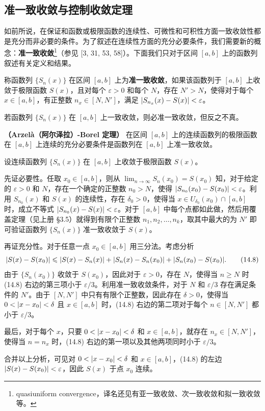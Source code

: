 \subsection{准一致收敛与控制收敛定理}

如前所说，在保证和函数或极限函数的连续性、可微性和可积性方面一致收敛性都是充分而非必要的条件。为了叙述在连续性方面的充分必要条件，我们需要新的概念：\textbf{准一致收敛}\footnote{quasiuniform convergence，译名还见有亚一致收敛、次一致收敛和拟一致收敛等。}（参见 [3, 31, 53, 58]）。下面我们只对于区间 $[a,b]$ 上的函数列叙述有关定义和结果。

\begin{xdefinition}
称函数列 $\{S_n(x)\}$ 在区间 $[a,b]$ 上为\textbf{准一致收敛}，如果该函数列于 $[a,b]$ 上收敛于极限函数 $S(x)$，且对每个 $\varepsilon>0$ 和每个 $N$，存在 $N'>N$，使得对于每个 $x\in[a,b]$，有正整数 $n_x\in[N,N']$，满足 $\lvert S_{n_x}(x)-S(x)\rvert<\varepsilon$。
\end{xdefinition}

\begin{xremark}
若函数列 $\{S_n(x)\}$ 在 $[a,b]$ 上一致收敛，则必准一致收敛，但反之不真。
\end{xremark}

\begin{xproposition}[14.2.3]
\textbf{（Arzelà（阿尔泽拉）-Borel 定理）} 在区间 $[a,b]$ 上的连续函数列的极限函数在 $[a,b]$ 上连续的充分必要条件是函数列在 $[a,b]$ 上准一致收敛。
\end{xproposition}
\begin{xproof}
设连续函数列 $\{S_n(x)\}$ 在 $[a,b]$ 上收敛于极限函数 $S(x)$。

先证必要性。任取 $x_0\in[a,b]$，则从 $\displaystyle\lim_{n\to\infty}S_n(x_0)=S(x_0)$ 知，对于给定的 $\varepsilon>0$ 和 $N$，存在一个确定的正整数 $n_0>N$，使得 $\lvert S_{n_0}(x_0)-S(x_0)\rvert<\varepsilon$。利用 $S_{n_0}(x)$ 和 $S(x)$ 的连续性，存在 $\delta_0>0$，使得当 $x\in U_{\delta_0}(x_0)\cap[a,b]$ 时，成立不等式 $\lvert S_{n_0}(x)-S(x)\rvert<\varepsilon$。对于 $[a,b]$ 中每个点都如此做，然后用覆盖定理（见上册 §3.5）就得到有限个正整数 $n_1,n_2,\ldots,n_k$，取其中最大的为 $N'$ 即可验证函数列 $\{S_n(x)\}$ 准一致收敛于 $S(x)$。

再证充分性。对于任意一点 $x_0\in[a,b]$ 用三分法。考虑分析
\begin{equation}
  \lvert S(x)-S(x_0)\rvert\leqslant\lvert S(x)-S_n(x)\rvert+\lvert S_n(x)-S_n(x_0)\rvert+\lvert S_n(x_0)-S(x_0)\rvert.
  \tag{14.8}
  \label{eq:14.8}
\end{equation}
由于 $\{S_n(x_0)\}$ 收敛于 $S(x_0)$，因此对于 $\varepsilon>0$，存在 $N$，使得当 $n\geqslant N$ 时 (14.8) 右边的第三项小于 $\varepsilon/3$。利用准一致收敛条件，对于 $N$ 和 $\varepsilon/3$ 存在满足条件的 $N'$。由于 $[N,N']$ 中只有有限个正整数，因此存在 $\delta>0$，使得当 $0<\lvert x-x_0\rvert<\delta$ 且 $x\in[a,b]$ 时，(14.8) 右边的第二项对于每个 $n\in[N,N']$ 都小于 $\varepsilon/3$。

最后，对于每个 $x$，只要 $0<\lvert x-x_0\rvert<\delta$ 和 $x\in[a,b]$，就存在 $n_x\in[N,N']$，使得当 $n=n_x$ 时，(14.8) 右边的第一项以及其他两项同时小于 $\varepsilon/3$。

合并以上分析，可见对 $0<\lvert x-x_0\rvert<\delta$ 和 $x\in[a,b]$，(14.8) 的左边 $\lvert S(x)-S(x_0)\rvert<\varepsilon$，因此 $S(x)$ 于点 $x_0$ 连续。
\end{xproof}

